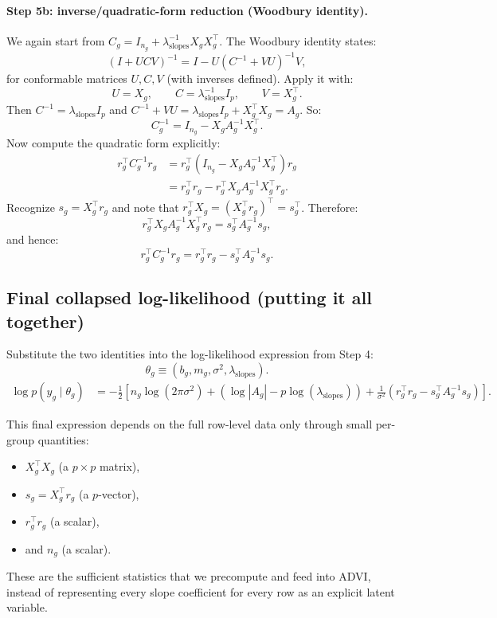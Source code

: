 \documentclass[11pt]{article}
\begin{document}
\paragraph{Step 5b: inverse/quadratic-form reduction (Woodbury identity).}
We again start from $C_g = I_{n_g} + \lambda_{\mathrm{slopes}}^{-1}X_gX_g^\top$.
The Woodbury identity states:
\[
  (I + UCV)^{-1} = I - U\left(C^{-1} + VU\right)^{-1}V,
\]
for conformable matrices $U,C,V$ (with inverses defined).
Apply it with:
\[
  U=X_g,\qquad C=\lambda_{\mathrm{slopes}}^{-1}I_p,\qquad V=X_g^\top.
\]
Then $C^{-1}=\lambda_{\mathrm{slopes}} I_p$ and $C^{-1}+VU=\lambda_{\mathrm{slopes}} I_p + X_g^\top X_g = A_g$.
So:
\[
  C_g^{-1} = I_{n_g} - X_g A_g^{-1}X_g^\top.
\]
Now compute the quadratic form explicitly:
\begin{align*}
  r_g^\top C_g^{-1}r_g
  &= r_g^\top\left(I_{n_g} - X_g A_g^{-1}X_g^\top\right)r_g \\
  &= r_g^\top r_g - r_g^\top X_g A_g^{-1}X_g^\top r_g.
\end{align*}
Recognize $s_g=X_g^\top r_g$ and note that $r_g^\top X_g = (X_g^\top r_g)^\top = s_g^\top$. Therefore:
\[
  r_g^\top X_g A_g^{-1}X_g^\top r_g = s_g^\top A_g^{-1}s_g,
\]
and hence:
\[
  r_g^\top C_g^{-1}r_g = r_g^\top r_g - s_g^\top A_g^{-1}s_g.
\]

\subsection{Final collapsed log-likelihood (putting it all together)}

Substitute the two identities into the log-likelihood expression from Step 4:
\[
  \theta_g \equiv (b_g,m_g,\sigma^2,\lambda_{\mathrm{slopes}}).
\]
\begin{align*}
  \log p(y_g\mid \theta_g)
  &= -\frac{1}{2}\left[
    n_g\log(2\pi\sigma^2)
    + \left(\log|A_g| - p\log(\lambda_{\mathrm{slopes}})\right)
    + \frac{1}{\sigma^2}\left(r_g^\top r_g - s_g^\top A_g^{-1} s_g\right)
  \right].
\end{align*}

This final expression depends on the full row-level data only through small per-group quantities:
\begin{itemize}
  \item $X_g^\top X_g$ (a $p\times p$ matrix),
  \item $s_g = X_g^\top r_g$ (a $p$-vector),
  \item $r_g^\top r_g$ (a scalar),
  \item and $n_g$ (a scalar).
\end{itemize}
These are the sufficient statistics that we precompute and feed into ADVI, instead of representing every slope coefficient
for every row as an explicit latent variable.
\end{document}
